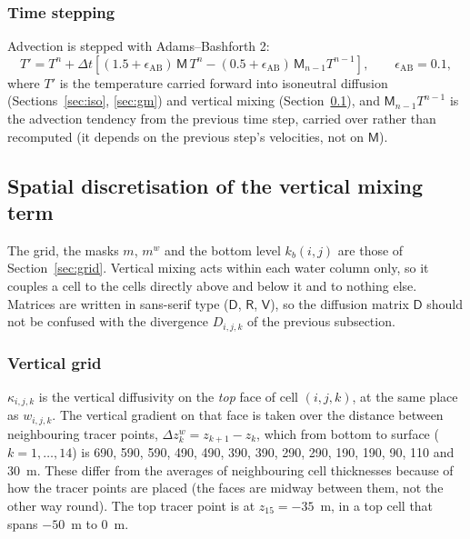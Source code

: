\documentclass{article}
\begin{document}
\subsubsection*{Time stepping}
Advection is stepped with Adams--Bashforth 2:
\begin{equation}
T' = T^n + \Delta t \left[ (1.5+\epsilon_\text{AB})\, \mathsf{M}\, T^n - (0.5+\epsilon_\text{AB})\, \mathsf{M}_{n-1}T^{n-1} \right], \qquad \epsilon_\text{AB} = 0.1,
\label{eq:ab2}
\end{equation}
where $T'$ is the temperature carried forward into isoneutral diffusion (Sections~\ref{sec:iso}, \ref{sec:gm}) and vertical mixing (Section~\ref{sec:vmix}), and $\mathsf{M}_{n-1}T^{n-1}$ is the advection tendency from the previous time step, carried over rather than recomputed (it depends on the previous step's velocities, not on $\mathsf{M}$).

\subsection{Spatial discretisation of the vertical mixing term}\label{sec:vmix}

The grid, the masks $m$, $m^w$ and the bottom level $k_b(i,j)$ are those of Section~\ref{sec:grid}.
Vertical mixing acts within each water column only, so it couples a cell to the cells directly above and below it and to nothing else.
Matrices are written in sans-serif type ($\mathsf{D}$, $\mathsf{R}$, $\mathsf{V}$), so the diffusion matrix $\mathsf{D}$ should not be confused with the divergence $D_{i,j,k}$ of the previous subsection.

\subsubsection*{Vertical grid}
$\kappa_{i,j,k}$ is the vertical diffusivity on the \emph{top} face of cell $(i,j,k)$, at the same place as $w_{i,j,k}$.
The vertical gradient on that face is taken over the distance between neighbouring tracer points, $\Delta z^w_k = z_{k+1} - z_k$, which from bottom to surface ($k = 1,\dots,14$) is
690, 590, 590, 490, 490, 390, 390, 290, 290, 190, 190, 90, 110 and 30~m.
These differ from the averages of neighbouring cell thicknesses because of how the tracer points are placed (the faces are midway between them, not the other way round).
The top tracer point is at $z_{15} = -35$~m, in a top cell that spans $-50$~m to $0$~m.
\end{document}
